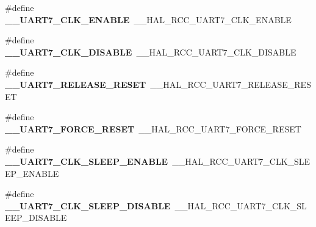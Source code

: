 \begin{DoxyCompactItemize}
\item 
\mbox{\label{group___h_a_l___r_c_c___aliased_ga7bb431add3abe23b0fdc920d818b478a}} 
\#define {\bfseries \+\_\+\+\_\+\+U\+A\+R\+T7\+\_\+\+C\+L\+K\+\_\+\+E\+N\+A\+B\+LE}~\+\_\+\+\_\+\+H\+A\+L\+\_\+\+R\+C\+C\+\_\+\+U\+A\+R\+T7\+\_\+\+C\+L\+K\+\_\+\+E\+N\+A\+B\+LE
\item 
\mbox{\label{group___h_a_l___r_c_c___aliased_gac296bb1fe20a4be61a6572c11021d61d}} 
\#define {\bfseries \+\_\+\+\_\+\+U\+A\+R\+T7\+\_\+\+C\+L\+K\+\_\+\+D\+I\+S\+A\+B\+LE}~\+\_\+\+\_\+\+H\+A\+L\+\_\+\+R\+C\+C\+\_\+\+U\+A\+R\+T7\+\_\+\+C\+L\+K\+\_\+\+D\+I\+S\+A\+B\+LE
\item 
\mbox{\label{group___h_a_l___r_c_c___aliased_ga5ba5a490c4e274abe50505d7458ee505}} 
\#define {\bfseries \+\_\+\+\_\+\+U\+A\+R\+T7\+\_\+\+R\+E\+L\+E\+A\+S\+E\+\_\+\+R\+E\+S\+ET}~\+\_\+\+\_\+\+H\+A\+L\+\_\+\+R\+C\+C\+\_\+\+U\+A\+R\+T7\+\_\+\+R\+E\+L\+E\+A\+S\+E\+\_\+\+R\+E\+S\+ET
\item 
\mbox{\label{group___h_a_l___r_c_c___aliased_gaaf86ef9f6097817a19c83e97285857ba}} 
\#define {\bfseries \+\_\+\+\_\+\+U\+A\+R\+T7\+\_\+\+F\+O\+R\+C\+E\+\_\+\+R\+E\+S\+ET}~\+\_\+\+\_\+\+H\+A\+L\+\_\+\+R\+C\+C\+\_\+\+U\+A\+R\+T7\+\_\+\+F\+O\+R\+C\+E\+\_\+\+R\+E\+S\+ET
\item 
\mbox{\label{group___h_a_l___r_c_c___aliased_ga947a94806fd8c9b1a322dccf17e05e4a}} 
\#define {\bfseries \+\_\+\+\_\+\+U\+A\+R\+T7\+\_\+\+C\+L\+K\+\_\+\+S\+L\+E\+E\+P\+\_\+\+E\+N\+A\+B\+LE}~\+\_\+\+\_\+\+H\+A\+L\+\_\+\+R\+C\+C\+\_\+\+U\+A\+R\+T7\+\_\+\+C\+L\+K\+\_\+\+S\+L\+E\+E\+P\+\_\+\+E\+N\+A\+B\+LE
\item 
\mbox{\label{group___h_a_l___r_c_c___aliased_ga8bef143f6c75c16d0bfe0e242eb798cb}} 
\#define {\bfseries \+\_\+\+\_\+\+U\+A\+R\+T7\+\_\+\+C\+L\+K\+\_\+\+S\+L\+E\+E\+P\+\_\+\+D\+I\+S\+A\+B\+LE}~\+\_\+\+\_\+\+H\+A\+L\+\_\+\+R\+C\+C\+\_\+\+U\+A\+R\+T7\+\_\+\+C\+L\+K\+\_\+\+S\+L\+E\+E\+P\+\_\+\+D\+I\+S\+A\+B\+LE
\item 
\mbox{\label{group___h_a_l___r_c_c___aliased_gad5875e7ed7c3a6d37da63cdf41998f52}} 

\end{DoxyCompactItemize}

